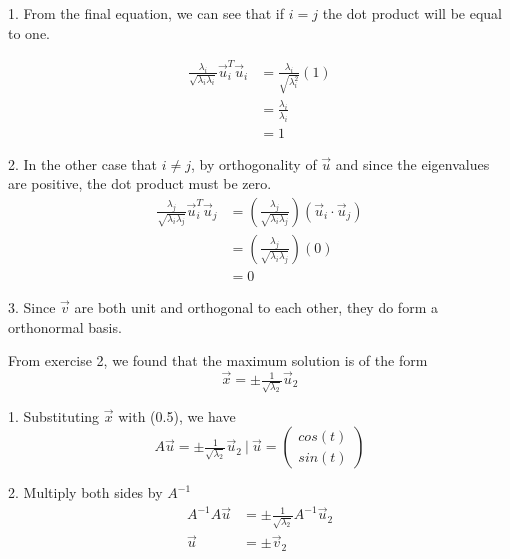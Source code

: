 \documentclass[12pt]{article}
\begin{document}
1. From the final equation, we can see that if $i=j$ the dot product will be equal to one.

\begin{align*}
    \tfrac{\lambda_{i}}{\sqrt{\lambda_{i}\lambda_{i}}} \vec{u}_{i}^T\vec{u}_{i} & = \tfrac{\lambda_{i}}{\sqrt{\lambda_{i}^2}} (1) \\
                                                                                & = \tfrac{\lambda_{i}}{\lambda_{i}}              \\
                                                                                & =1
\end{align*}

2. In the other case that $i\neq{j}$, by orthogonality of $\vec{u}$ and since the eigenvalues are positive, the dot product must be zero.
\begin{align*}
    \tfrac{\lambda_{j}}{\sqrt{\lambda_{i}\lambda_{j}}} \vec{u}_{i}^T\vec{u}_{j} & =  (\tfrac{\lambda_{j}}{\sqrt{\lambda_{i}\lambda_{j}}}) (\vec{u}_{i}\cdot{}\vec{u}_{j}) \\
                                                                                & = (\tfrac{\lambda_{j}}{\sqrt{\lambda_{i}\lambda_{j}}}) (0)                              \\
                                                                                & = 0
\end{align*}

3. Since $\vec{v}$ are both unit and orthogonal to each other, they do form a orthonormal basis.

\vspace{0.5cm}

\noindent{} From exercise 2, we found that the maximum solution is of the form
\[
    \vec{x} = \pm{}\tfrac{1}{\sqrt{\lambda{}_2}}\vec{u}_2
\]

1. Substituting $\vec{x}$ with (0.5), we have
\[
    A\vec{u} = \pm{}\tfrac{1}{\sqrt{\lambda{}_2}}\vec{u}_2 ~|~ \vec{u} = \begin{pmatrix} cos(t) \\ sin(t) \end{pmatrix}
\]

2. Multiply both sides by $A^{-1}$
\begin{align*}
    A^{-1}A\vec{u} & = \pm{}\tfrac{1}{\sqrt{\lambda{}_2}}A^{-1}\vec{u}_2 \\
    \vec{u}        & = \pm{}\vec{v}_2
\end{align*}
\end{document}
